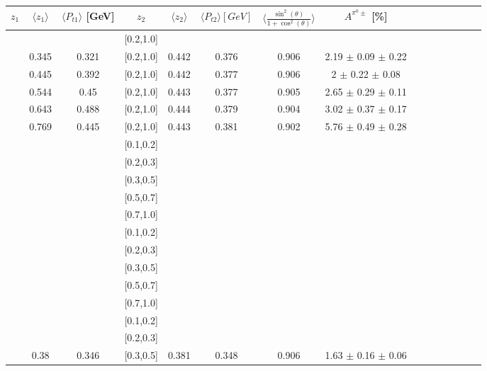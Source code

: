 \begin{table}[H]\tiny
\centering
\renewcommand{\arraystretch}{1.5}
\begin{tabular}{|c| c| c| c| c| c| c| c| c| c|c| c| c| c| c|}
\hline
$z_1$ & $\langle  z_1\rangle$ & $\langle  P_{t1} \rangle$ [GeV] & $z_2$ & $\langle  z_2 \rangle$ & $\langle  P_{t2}  \rangle [GeV] $& $\langle\frac{\sin^2(\theta)}{1+\cos^2(\theta)}\rangle$ & $A^{\pi^0\pm}$ [\%]  \\ \hline
[0.2,0.3]	&		&		&	[0.2,1.0]	&		&		&		&							\\ \hline
[0.3,0.4]	&	0.345	&	0.321	&	[0.2,1.0]	&	0.442	&	0.376	&	0.906	& 2.19  $\pm$ 0.09  $\pm$ 0.22    	\\ \hline
[0.4,0.5]	&	0.445	&	0.392	&	[0.2,1.0]	&	0.442	&	0.377	&	0.906	& 2  $\pm$ 0.22  $\pm$ 0.08       	\\ \hline
[0.5,0.6]	&	0.544	&	0.45	&	[0.2,1.0]	&	0.443	&	0.377	&	0.905	& 2.65  $\pm$ 0.29  $\pm$ 0.11    	\\ \hline
[0.6,0.7]	&	0.643	&	0.488	&	[0.2,1.0]	&	0.444	&	0.379	&	0.904	& 3.02  $\pm$ 0.37  $\pm$ 0.17    	\\ \hline
[0.7,1.0]	&	0.769	&	0.445	&	[0.2,1.0]	&	0.443	&	0.381	&	0.902	& 5.76  $\pm$ 0.49  $\pm$ 0.28    	\\ \hline
\hline
[0.1,0.2]	&		&		&	[0.1,0.2]	&		&		&		&							\\ \hline
[0.1,0.2]	&		&		&	[0.2,0.3]	&		&		&		&							\\ \hline
[0.1,0.2]	&		&		&	[0.3,0.5]	&		&		&		&							\\ \hline
[0.1,0.2]	&		&		&	[0.5,0.7]	&		&		&		&							\\ \hline
[0.1,0.2]	&		&		&	[0.7,1.0]	&		&		&		&							\\ \hline
\hline
[0.2,0.3]	&		&		&	[0.1,0.2]	&		&		&		&							\\ \hline
[0.2,0.3]	&		&		&	[0.2,0.3]	&		&		&		&							\\ \hline
[0.2,0.3]	&		&		&	[0.3,0.5]	&		&		&		&							\\ \hline
[0.2,0.3]	&		&		&	[0.5,0.7]	&		&		&		&							\\ \hline
[0.2,0.3]	&		&		&	[0.7,1.0]	&		&		&		&							\\ \hline
\hline
[0.3,0.5]	&		&		&	[0.1,0.2]	&		&		&		&							\\ \hline
[0.3,0.5]	&		&		&	[0.2,0.3]	&		&		&		&							\\ \hline
[0.3,0.5]	&	0.38	&	0.346	&	[0.3,0.5]	&	0.381	&	0.348	&	0.906	& 1.63  $\pm$ 0.16  $\pm$ 0.06  	\\ \hline

\end{tabular}
\end{table}

